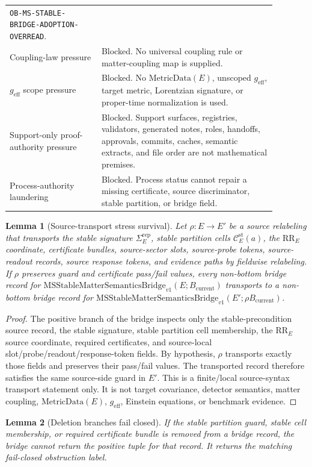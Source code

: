 \documentclass[11pt]{article}
\newcommand{\Bcur}{B_{\mathrm{current}}}
\newcommand{\MSBridge}{\mathrm{MSStableMatterSemanticsBridge}_{v1}}
\newcommand{\MSSig}{\Sigma^{\mathrm{rep}}_E}
\newcommand{\MSCell}{\mathcal C^{\mathrm{st}}_E}
\newcommand{\MetricData}{\mathrm{MetricData}}
\newcommand{\geff}{g_{\mathrm{eff}}}
\newtheorem{lemma}{Lemma}
\begin{document}
\begin{longtable}{p{0.30\linewidth}p{0.58\linewidth}}
\texttt{OB-MS-STABLE-BRIDGE-ADOPTION-OVERREAD}. \\
Coupling-law pressure & Blocked. No universal coupling rule or matter-coupling
map is supplied. \\
\(\geff\) scope pressure & Blocked. No \(\MetricData(E)\), unscoped
\(\geff\), target metric, Lorentzian signature, or proper-time normalization
is used. \\
Support-only proof-authority pressure & Blocked. Support surfaces, registries,
validators, generated notes, roles, handoffs, approvals, commits, caches,
semantic extracts, and file order are not mathematical premises. \\
Process-authority laundering & Blocked. Process status cannot repair a
missing certificate, source discriminator, stable partition, or bridge field. \\
\bottomrule
\end{longtable}

\begin{lemma}[Source-transport stress survival]
Let \(\rho:E\to E'\) be a source relabeling that transports the stable
signature \(\MSSig\), stable partition cells \(\MSCell(a)\), the
\(\mathrm{RR}_E\) coordinate, certificate bundles, source-sector slots,
source-probe tokens, source-readout records, source response tokens, and
evidence paths by fieldwise relabeling. If \(\rho\) preserves guard and
certificate pass/fail values, every non-bottom bridge record for
\(\MSBridge(E;\Bcur)\) transports to a non-bottom bridge record for
\(\MSBridge(E';\rho\Bcur)\).
\end{lemma}

\begin{proof}
The positive branch of the bridge inspects only the stable-precondition source
record, the stable signature, stable partition cell membership, the
\(\mathrm{RR}_E\) source coordinate, required certificates, and source-local
slot/probe/readout/response-token fields. By hypothesis, \(\rho\) transports
exactly those fields and preserves their pass/fail values. The transported
record therefore satisfies the same source-side guard in \(E'\). This is a
finite/local source-syntax transport statement only. It is not target
covariance, detector semantics, matter coupling, \(\MetricData(E)\),
\(\geff\), Einstein equations, or benchmark evidence.
\end{proof}

\begin{lemma}[Deletion branches fail closed]
If the stable partition guard, stable cell membership, or required certificate
bundle is removed from a bridge record, the bridge cannot return the positive
tuple for that record. It returns the matching fail-closed obstruction label.
\end{lemma}
\end{document}
